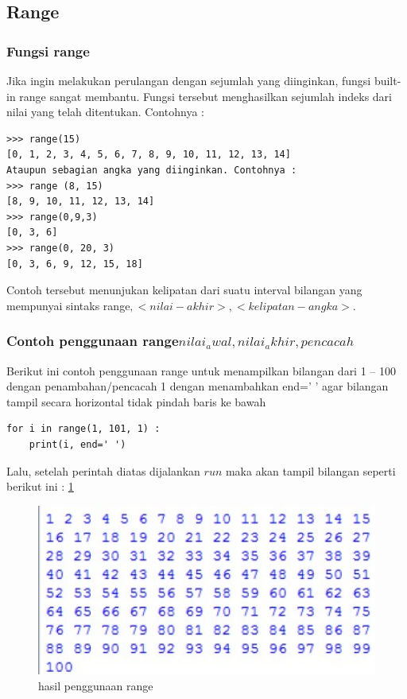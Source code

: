 \subsection{Range}
\subsubsection{Fungsi range\(\)}
Jika ingin melakukan perulangan dengan sejumlah yang diinginkan, fungsi built-in range sangat membantu. Fungsi tersebut menghasilkan sejumlah indeks dari nilai yang telah ditentukan. 
Contohnya :
\begin{verbatim}
>>> range(15)
[0, 1, 2, 3, 4, 5, 6, 7, 8, 9, 10, 11, 12, 13, 14]
Ataupun sebagian angka yang diinginkan. Contohnya :
>>> range (8, 15)
[8, 9, 10, 11, 12, 13, 14]
>>> range(0,9,3)
[0, 3, 6]
>>> range(0, 20, 3)
[0, 3, 6, 9, 12, 15, 18]
\end{verbatim}
 Contoh tersebut menunjukan kelipatan dari suatu interval bilangan yang mempunyai sintaks range\(<nilai-awal>, <nilai-akhir>, <kelipatan-angka>\).
\subsubsection{Contoh penggunaan range\(nilai_awal,nilai_akhir,pencacah\)}
Berikut ini contoh penggunaan range untuk menampilkan bilangan dari 1 – 100 dengan penambahan/pencacah 1 dengan menambahkan end=’ ’ agar bilangan tampil secara horizontal tidak pindah baris ke bawah
\begin{verbatim}
for i in range(1, 101, 1) :
    print(i, end=' ')
\end{verbatim}
Lalu, setelah perintah diatas dijalankan \(run\) maka akan tampil bilangan seperti berikut ini :
\ref{2_range}

\begin{figure}[ht]
    \centerline{\includegraphics[width=1\textwidth]{figures/2_range.JPG}}
    \caption{hasil penggunaan range}
    \label{2_range}
    \end{figure}
    

